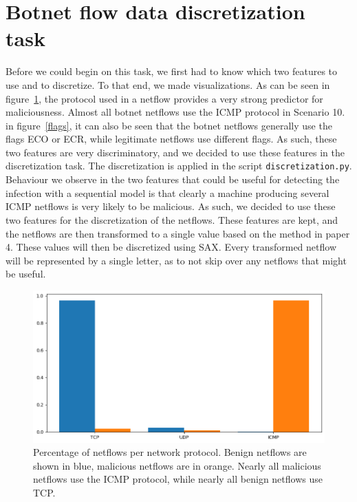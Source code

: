 \documentclass[]{article}
\begin{document}
\section{Botnet flow data discretization task}
Before we could begin on this task, we first had to know which two features to use and to discretize. To that end, we made visualizations. As can be seen in figure~\ref{protocol}, the protocol used in a netflow provides a very strong predictor for maliciousness. Almost all botnet netflows use the ICMP protocol in Scenario 10. in figure~\ref{flags}, it can also be seen that the botnet netflows generally use the flags ECO or ECR, while legitimate netflows use different flags. As such, these two features are very discriminatory, and we decided to use these features in the discretization task. The discretization is applied in the script \texttt{discretization.py}. Behaviour we observe in the two features that could be useful for detecting the infection with a sequential model is that clearly a machine producing several ICMP netflows is very likely to be malicious. As such, we decided to use these two features for the discretization of the netflows. These features are kept, and the netflows are then transformed to a single value based on the method in paper 4. These values will then be discretized using SAX. Every transformed netflow will be represented by a single letter, as to not skip over any netflows that might be useful.
\begin{figure}[H]
\begin{center}
\includegraphics[scale=0.4]{scenario10_networkprotocol.png}
\caption{Percentage of netflows per network protocol. Benign netflows are shown in blue, malicious netflows are in orange. Nearly all malicious netflows use the ICMP protocol, while nearly all benign netflows use TCP. }
\label{protocol}
\end{center}
\end{figure}
\end{document}
